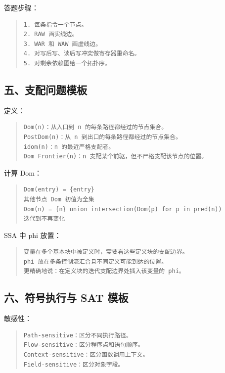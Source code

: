 \documentclass[UTF8,zihao=-4]{ctexart}
\begin{document}
答题步骤：


\begin{quote}
\footnotesize
\begin{verbatim}
1. 每条指令一个节点。
2. RAW 画实线边。
3. WAR 和 WAW 画虚线边。
4. 对写后写、读后写冲突做寄存器重命名。
5. 对剩余依赖图给一个拓扑序。
\end{verbatim}
\end{quote}


\subsection{五、支配问题模板}


定义：


\begin{quote}
\footnotesize
\begin{verbatim}
Dom(n)：从入口到 n 的每条路径都经过的节点集合。
PostDom(n)：从 n 到出口的每条路径都经过的节点集合。
idom(n)：n 的最近严格支配者。
Dom Frontier(n)：n 支配某个前驱，但不严格支配该节点的位置。
\end{verbatim}
\end{quote}


计算 Dom：


\begin{quote}
\footnotesize
\begin{verbatim}
Dom(entry) = {entry}
其他节点 Dom 初值为全集
Dom(n) = {n} union intersection(Dom(p) for p in pred(n))
迭代到不再变化
\end{verbatim}
\end{quote}


SSA 中 phi 放置：


\begin{quote}
\footnotesize
\begin{verbatim}
变量在多个基本块中被定义时，需要看这些定义块的支配边界。
phi 放在多条控制流汇合且不同定义可能到达的位置。
更精确地说：在定义块的迭代支配边界处插入该变量的 phi。
\end{verbatim}
\end{quote}


\subsection{六、符号执行与 SAT 模板}


敏感性：


\begin{quote}
\footnotesize
\begin{verbatim}
Path-sensitive：区分不同执行路径。
Flow-sensitive：区分程序点和语句顺序。
Context-sensitive：区分函数调用上下文。
Field-sensitive：区分对象字段。
\end{verbatim}
\end{quote}
\end{document}
